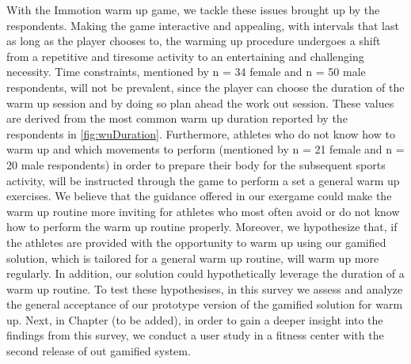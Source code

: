 With the Immotion warm up game, we tackle these issues brought up by the respondents. Making the game interactive and appealing, with intervals that last as long as the player chooses to, the warming up procedure undergoes a shift from a repetitive and tiresome activity to an entertaining and challenging necessity. Time constraints, mentioned by n = 34 female and n = 50 male respondents, will not be prevalent, since the player can choose the duration of the warm up session and by doing so plan ahead the work out session. These values are derived from the most common warm up duration reported by the respondents in \ref{fig:wuDuration}. Furthermore, athletes who do not know how to warm up and which movements to perform (mentioned by n = 21 female and n = 20 male respondents) in order to prepare their body for the subsequent sports activity, will be instructed through the game to perform a set a general warm up exercises. We believe that the guidance offered in our exergame could make the warm up routine more inviting for athletes who most often avoid or do not know how to perform the warm up routine properly. Moreover, we hypothesize that, if the athletes are provided with the opportunity to warm up using our gamified solution, which is tailored for a general warm up routine, will warm up more regularly. In addition, our solution could hypothetically leverage the duration of a warm up routine. To test these hypothesises, in this survey we assess and analyze the general acceptance of our prototype version of the gamified solution for warm up. Next, in Chapter (to be added), in order to gain a deeper insight into the findings from this survey, we conduct a user study in a fitness center with the second release of out gamified system.
